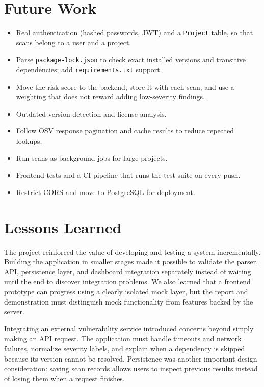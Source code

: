 \documentclass[12pt,a4paper]{report}
\begin{document}
\section{Future Work}
\begin{itemize}[leftmargin=*]
  \item Real authentication (hashed passwords, JWT) and a \texttt{Project} table, so that scans belong to a user and a project.
  \item Parse \texttt{package-lock.json} to check exact installed versions and transitive dependencies; add \texttt{requirements.txt} support.
  \item Move the risk score to the backend, store it with each scan, and use a weighting that does not reward adding low-severity findings.
  \item Outdated-version detection and license analysis.
  \item Follow OSV response pagination and cache results to reduce repeated lookups.
  \item Run scans as background jobs for large projects.
  \item Frontend tests and a CI pipeline that runs the test suite on every push.
  \item Restrict CORS and move to PostgreSQL for deployment.
\end{itemize}

\section{Lessons Learned}
The project reinforced the value of developing and testing a system incrementally. Building the application in smaller stages made it possible to validate the parser, API, persistence layer, and dashboard integration separately instead of waiting until the end to discover integration problems. We also learned that a frontend prototype can progress using a clearly isolated mock layer, but the report and demonstration must distinguish mock functionality from features backed by the server.

Integrating an external vulnerability service introduced concerns beyond simply making an API request. The application must handle timeouts and network failures, normalize severity labels, and explain when a dependency is skipped because its version cannot be resolved. Persistence was another important design consideration: saving scan records allows users to inspect previous results instead of losing them when a request finishes.
\end{document}
